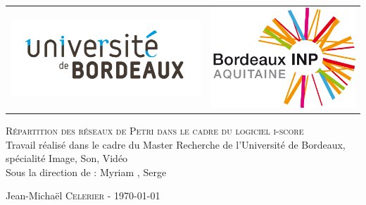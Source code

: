 \begin{titlepage}
  \begin{center}
  	
	\begin{tabular}{cc}
		\includegraphics[scale=0.3]{images/UnivBdx.jpg} & \includegraphics[scale=0.3]{images/BordeauxINP.jpg}
	\end{tabular}


	\begin{spacing}{1.7}
    \textsc{\Huge Répartition des réseaux de Petri dans le cadre du logiciel i-score}\\[1cm]
    {\huge Travail réalisé dans le cadre du Master Recherche de l'Université de Bordeaux, spécialité Image, Son, Vidéo}\\[1cm]
    {\Large Sous la direction de : }
    {\Large Myriam ,
     Serge }
    \end{spacing}
  \end{center}
  
  \begin{flushbottom}
   \begin{flushleft}
    \large Jean-Michaël \textsc{Celerier} - \today \\
   \end{flushleft}
  \end{flushbottom}
\end{titlepage}
\clearpage


